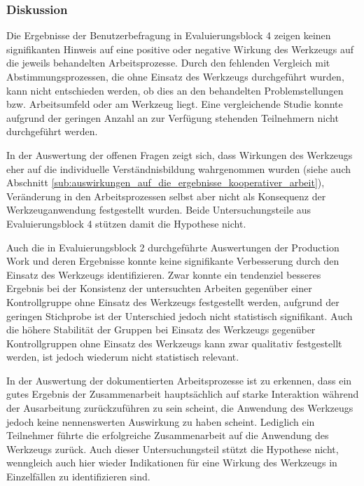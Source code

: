 
\subsubsection{Diskussion} 

Die Ergebnisse der Benutzerbefragung in Evaluierungsblock 4 zeigen keinen signifikanten Hinweis auf eine positive oder negative Wirkung des Werkzeugs auf die jeweils behandelten Arbeitsprozesse. Durch den fehlenden Vergleich mit Abstimmungsprozessen, die ohne Einsatz des Werkzeugs durchgeführt wurden, kann nicht entschieden werden, ob dies an den behandelten Problemstellungen bzw. Arbeitsumfeld oder am Werkzeug liegt. Eine vergleichende Studie konnte aufgrund der geringen Anzahl an zur Verfügung stehenden Teilnehmern nicht durchgeführt werden.

In der Auswertung der offenen Fragen zeigt sich, dass Wirkungen des Werkzeugs eher auf die individuelle Verständnisbildung wahrgenommen wurden (siehe auch Abschnitt \ref{sub:auswirkungen_auf_die_ergebnisse_kooperativer_arbeit}), Veränderung in den Arbeitsprozessen selbst aber nicht als Konsequenz der Werkzeuganwendung festgestellt wurden. Beide Untersuchungsteile aus Evaluierungsblock 4 stützen damit die Hypothese nicht.

Auch die in Evaluierungsblock 2 durchgeführte Auswertungen der Production Work und deren Ergebnisse konnte keine signifikante Verbesserung durch den Einsatz des Werkzeugs identifizieren. Zwar konnte ein tendenziel besseres Ergebnis bei der Konsistenz der untersuchten Arbeiten gegenüber einer Kontrollgruppe ohne Einsatz des Werkzeugs festgestellt werden, aufgrund der geringen Stichprobe ist der Unterschied jedoch nicht statistisch signifikant. Auch die höhere Stabilität der Gruppen bei Einsatz des Werkzeugs gegenüber Kontrollgruppen ohne Einsatz des Werkzeugs kann zwar qualitativ festgestellt werden, ist jedoch wiederum nicht statistisch relevant. 

In der Auswertung der dokumentierten Arbeitsprozesse ist zu erkennen, dass ein gutes Ergebnis der Zusammenarbeit hauptsächlich auf starke Interaktion während der Ausarbeitung zurückzuführen zu sein scheint, die Anwendung des Werkzeugs jedoch keine nennenswerten Auswirkung zu haben scheint. Lediglich ein Teilnehmer führte die erfolgreiche Zusammenarbeit auf die Anwendung des Werkzeugs zurück. Auch dieser Untersuchungsteil stützt die Hypothese nicht, wenngleich auch hier wieder Indikationen für eine Wirkung des Werkzeugs in Einzelfällen zu identifizieren sind.

